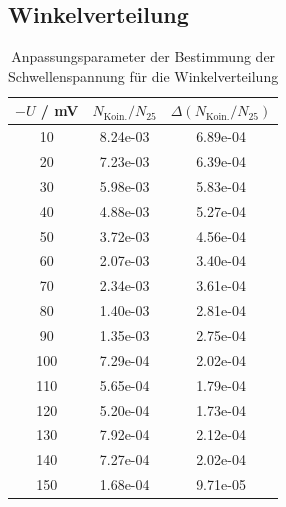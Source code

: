 \documentclass{article}
\begin{document}
\subsection*{Winkelverteilung}
\begin{table}[H]
    \centering
    \caption{Anpassungsparameter der Bestimmung der Schwellenspannung für die Winkelverteilung}
    \begin{tabular}{|c|c|c|}
        \hline
        $-U$ / mV & $N_\mathrm{Koin.}/N_{25}$ & $\Delta (N_\mathrm{Koin.}/N_{25})$ \\ \hline
        10 & 8.24e-03 & 6.89e-04 \\ \hline
        20 & 7.23e-03 & 6.39e-04 \\ \hline
        30 & 5.98e-03 & 5.83e-04 \\ \hline
        40 & 4.88e-03 & 5.27e-04 \\ \hline
        50 & 3.72e-03 & 4.56e-04 \\ \hline
        60 & 2.07e-03 & 3.40e-04 \\ \hline
        70 & 2.34e-03 & 3.61e-04 \\ \hline
        80 & 1.40e-03 & 2.81e-04 \\ \hline
        90 & 1.35e-03 & 2.75e-04 \\ \hline
        100 & 7.29e-04 & 2.02e-04 \\ \hline
        110 & 5.65e-04 & 1.79e-04 \\ \hline
        120 & 5.20e-04 & 1.73e-04 \\ \hline
        130 & 7.92e-04 & 2.12e-04 \\ \hline
        140 & 7.27e-04 & 2.02e-04 \\ \hline
        150 & 1.68e-04 & 9.71e-05 \\ \hline
    \end{tabular}   
    \label{tab:SchwellenspannungWinkelverteilung}
\end{table}
\newpage
\printbibliography[heading=bibintoc]
\end{document}
